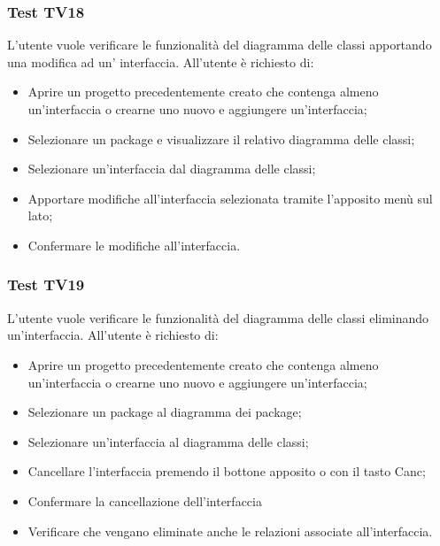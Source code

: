 \documentclass[../PianoDiQualifica.tex]{subfiles}
\begin{document}
	\subsubsection{Test TV18} 
	L'utente vuole verificare le funzionalità del diagramma delle classi apportando una modifica ad un' interfaccia. 
	All'utente è richiesto di: 
	\begin{itemize} 
		\item Aprire un progetto precedentemente creato che contenga almeno un'interfaccia o crearne uno nuovo e aggiungere un'interfaccia;
		\item Selezionare un package e visualizzare il relativo diagramma delle classi; 
		\item Selezionare un'interfaccia dal diagramma delle classi; 
		\item Apportare modifiche all'interfaccia selezionata tramite l'apposito menù sul lato; 
		\item Confermare le modifiche all'interfaccia. 
	\end{itemize} 
	
	
	\subsubsection{Test TV19} 
	L'utente vuole verificare le funzionalità del diagramma delle classi eliminando un'interfaccia. 
	All'utente è richiesto di: 
	\begin{itemize} 
		\item Aprire un progetto precedentemente creato che contenga almeno un'interfaccia o crearne uno nuovo e aggiungere un'interfaccia;
		\item Selezionare un package al diagramma dei package; 
		\item Selezionare un'interfaccia al diagramma delle classi; 
		\item Cancellare l'interfaccia premendo il bottone apposito o con il tasto Canc; 
		\item Confermare la cancellazione dell'interfaccia 
		\item Verificare che vengano eliminate anche le relazioni associate all'interfaccia. 
	\end{itemize} 
	
	
\end{document}
